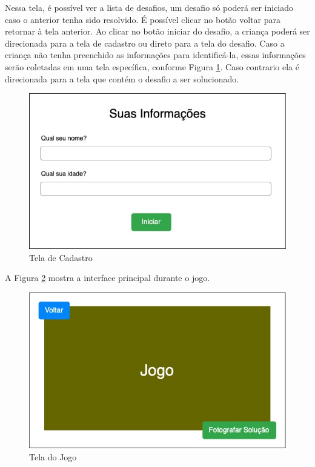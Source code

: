     Nessa tela, é possível ver a lista de desafios, um desafio só poderá ser iniciado caso o anterior tenha sido resolvido.
    É possível clicar no botão voltar para retornar à tela anterior.
    Ao clicar no botão iniciar do desafio, a criança poderá ser direcionada para a tela de cadastro ou direto para a tela do desafio.
    Caso a criança não tenha preenchido as informações para identificá-la, essas informações serão coletadas em uma tela específica, conforme Figura \ref{figura:cadastro}. Caso contrario ela é direcionada para a tela que contém o desafio a ser solucionado.
    
    \begin{figure}[H]
        \caption{Tela de Cadastro}
        \begin{center}
            \includegraphics[width=\linewidth]{Imagens/cap3/informacoes_usuario.jpg}
        \end{center}
        \label{figura:cadastro}
    \end{figure}
    
    A Figura \ref{figura:tela_jogo} mostra a interface principal durante o jogo.
    
    \begin{figure}[H]
        \caption{Tela do Jogo}
        \begin{center}
            \includegraphics[width=\linewidth]{Imagens/cap3/tela_jogo.jpg}
        \end{center}
        \label{figura:tela_jogo}
    \end{figure}
    
